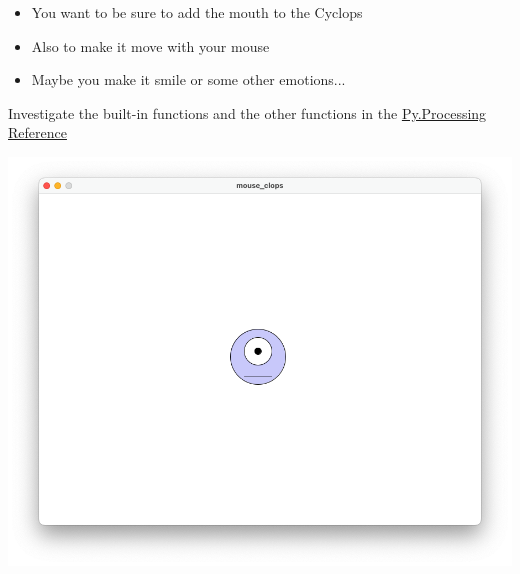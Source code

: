 \documentclass{ucph-handout}
\begin{document}
\newpage

\begin{exercisebox}[adjusted title= Extras]
\begin{itemize}
\item You want to be sure to add the mouth to the Cyclops
\item Also to make it move with your mouse
\item Maybe you make it smile or some other emotions...
\end{itemize}

\begin{minipage}{0.60\linewidth}
Investigate the  built-in   functions and the other functions in the \href{https://py.processing.org/reference/}{Py.Processing Reference}  
\end{minipage}

\begin{minipage}{0.40\linewidth}
\includegraphics[width=2.5\textwidth]{illustrationer/cyclops_mouse} 
\end{minipage}
~
\end{exercisebox}
\end{document}
